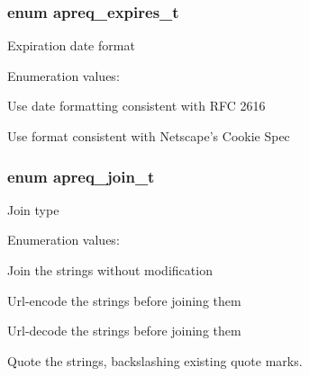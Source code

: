 \subsubsection{\setlength{\rightskip}{0pt plus 5cm}enum apreq\_\-expires\_\-t}\label{group__Utils_a36}


Expiration date format \begin{Desc}
\item[Enumeration values: ]\par
\begin{description}
\item[{\em 
{\em HTTP}\label{group__Utils_a36a20}
}]Use date formatting consistent with RFC 2616 \item[{\em 
{\em NSCOOKIE}\label{group__Utils_a36a21}
}]Use format consistent with Netscape's Cookie Spec \end{description}
\end{Desc}

\subsubsection{\setlength{\rightskip}{0pt plus 5cm}enum apreq\_\-join\_\-t}\label{group__Utils_a34}


Join type \begin{Desc}
\item[Enumeration values: ]\par
\begin{description}
\item[{\em 
{\em AS\_\-IS}\label{group__Utils_a34a14}
}]Join the strings without modification \item[{\em 
{\em ENCODE}\label{group__Utils_a34a15}
}]Url-encode the strings before joining them \item[{\em 
{\em DECODE}\label{group__Utils_a34a16}
}]Url-decode the strings before joining them \item[{\em 
{\em QUOTE}\label{group__Utils_a34a17}
}]Quote the strings, backslashing existing quote marks. \end{description}
\end{Desc}

